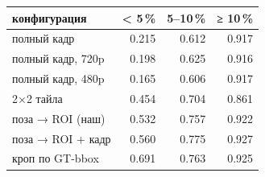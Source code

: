 \begin{tabular}{lrrr}
\toprule
конфигурация & < 5\,\% & 5–10\,\% & ≥ 10\,\% \\
\midrule
полный кадр & 0.215 & 0.612 & 0.917 \\
полный кадр, 720p & 0.198 & 0.625 & 0.916 \\
полный кадр, 480p & 0.165 & 0.606 & 0.917 \\
2×2 тайла & 0.454 & 0.704 & 0.861 \\
поза → ROI (наш) & 0.532 & 0.757 & 0.922 \\
поза → ROI + кадр & 0.560 & 0.775 & 0.927 \\
кроп по GT-bbox & 0.691 & 0.763 & 0.925 \\
\bottomrule
\end{tabular}
